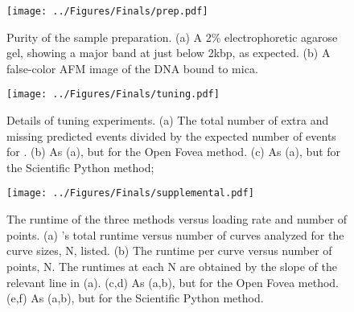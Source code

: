 \begin{figure}[htp]
\caption[Verification of sample purity]{\noindent{}\pStartF Purity of the sample preparation. (a) A 2\% electrophoretic agarose gel, showing a major band at just below 2kbp, as expected. (b) A false-color AFM image of the DNA bound to mica. \pEndF }
\centering
\texttt{[image: ../Figures/Finals/prep.pdf]}%
\end{figure}


\begin{figure}[htp]
\caption[Cross validation of algorithms and optimal parameters]{\noindent{}\pStartF Details of tuning experiments. (a) The total number of extra and missing predicted events divided by the expected number of events for \name{}. (b) As (a), but for the Open Fovea method. (c) As (a), but for the Scientific Python method; \pEndF }
\centering
\texttt{[image: ../Figures/Finals/tuning.pdf]}%
\end{figure}



\begin{figure}
\caption[Algorithmic runtime versus loading rate]{\noindent{}\pStartF The runtime of the three methods versus loading rate and number of points. (a) \name{}'s total runtime versus number of curves analyzed for the curve sizes, N, listed. (b) The runtime per curve versus number of points, N. The runtimes at each N are obtained by the slope of the relevant line in (a).  (c,d) As (a,b), but for the Open Fovea method. (e,f) As (a,b), but for the Scientific Python method. \pEndF }
\centering
\texttt{[image: ../Figures/Finals/supplemental.pdf]}%
\end{figure}





%

%

%
